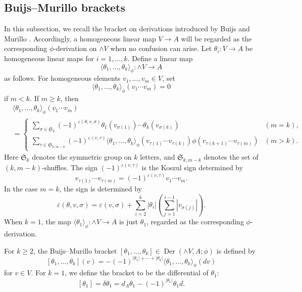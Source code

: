 \documentclass[a4paper,10pt]{amsart}
\theoremstyle{definition}
\theoremstyle{remark}
\newcommand{\Der}{\operatorname{Der}}
\numberwithin{equation}{section}
\begin{document}
\subsection{Buijs--Murillo brackets}

In this subsection, we recall the bracket on derivations introduced by Buijs and Murillo \cite{BM2008}.
Accordingly, a homogeneous linear map $V\to A$ will be regarded as the corresponding $\phi$-derivation on $\wedge V$ when no confusion can arise.
Let $\theta_i:V\to A$ be homogeneous linear maps for $i=1,\ldots,k$.
Define a linear map
\[
        \langle \theta_1,\ldots,\theta_k\rangle_{\phi}
        :\wedge V\longrightarrow A
\]
as follows. For homogeneous elements $v_1,\ldots,v_m\in V$, set
\[
        \langle \theta_1,\ldots,\theta_k\rangle_{\phi}
        (v_1\cdots v_m)=0
\]
if $m<k$. If $m\geq k$, then
\begin{align*}
&\langle \theta_1,\ldots,\theta_k\rangle_{\phi}(v_1\cdots v_m) \\
&=
\begin{cases}
\displaystyle
\sum_{\sigma\in \mathfrak S_k}
(-1)^{\varepsilon(\theta,v,\sigma)}
\theta_1(v_{\sigma(1)})\cdots \theta_k(v_{\sigma(k)})
& (m=k), \\[3mm]
\displaystyle
\sum_{\tau\in \mathfrak S_{k,m-k}}
(-1)^{\varepsilon(v,\tau)}
\langle \theta_1,\ldots,\theta_k\rangle_{\phi}
(v_{\tau(1)}\cdots v_{\tau(k)})
\phi(v_{\tau(k+1)}\cdots v_{\tau(m)})
& (m>k).
\end{cases}
\end{align*}
Here $\mathfrak S_k$ denotes the symmetric group on $k$ letters, and
$\mathfrak S_{k,m-k}$ denotes the set of $(k,m-k)$-shuffles.
The sign $(-1)^{\varepsilon(v,\tau)}$ is the Koszul sign determined by
\[
        v_{\tau(1)}\cdots v_{\tau(m)}
        =
        (-1)^{\varepsilon(v,\tau)}
        v_1\cdots v_m .
\]
In the case $m=k$, the
sign is determined by
\[
\varepsilon(\theta,v,\sigma)
=
\varepsilon(v,\sigma)
+
\sum_{i=2}^k |\theta_i|
\left(\sum_{j=1}^{i-1}|v_{\sigma(j)}|\right).
\]
When $k=1$, the map
$
\langle\theta_1\rangle_{\phi}:\wedge V\to A
$
is just $\theta_1$, regarded as the corresponding $\phi$-derivation.

For $k\geq 2$, the Buijs--Murillo bracket
$
[\theta_1,\ldots,\theta_k]\in \Der(\wedge V,A;\phi)
$
is defined by
\[
[\theta_1,\ldots,\theta_k](v)
=
-
(-1)^{|\theta_1|+\cdots+|\theta_k|}
\langle \theta_1,\ldots,\theta_k\rangle_{\phi}(dv)
\]
for $v\in V$. 
For $k=1$, we define the bracket to be the differential of $\theta_1$:
\[
        [\theta_1]=\delta\theta_1
        =
        d_A\theta_1-(-1)^{|\theta_1|}\theta_1d.
\]
\end{document}
